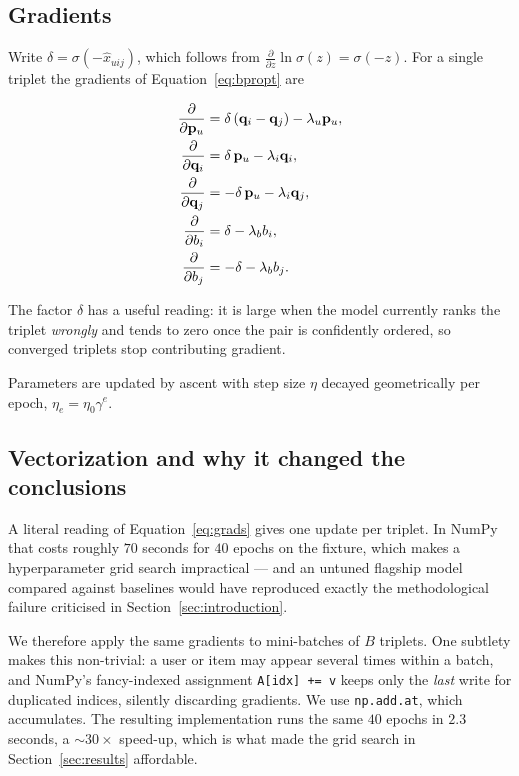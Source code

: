 \subsection{Gradients}

Write $\delta = \sigma(-\hat{x}_{uij})$, which follows from
$\frac{\partial}{\partial z}\ln\sigma(z) = \sigma(-z)$. For a single triplet
the gradients of Equation~\ref{eq:bpropt} are

\begin{align}
  \frac{\partial}{\partial \mathbf{p}_u} &= \delta\,(\mathbf{q}_i - \mathbf{q}_j) - \lambda_u \mathbf{p}_u ,\\
  \frac{\partial}{\partial \mathbf{q}_i} &= \delta\,\mathbf{p}_u - \lambda_i \mathbf{q}_i ,\\
  \frac{\partial}{\partial \mathbf{q}_j} &= -\delta\,\mathbf{p}_u - \lambda_i \mathbf{q}_j ,\\
  \frac{\partial}{\partial b_i}     &= \delta - \lambda_b b_i ,\\
  \frac{\partial}{\partial b_j}     &= -\delta - \lambda_b b_j .
  \label{eq:grads}
\end{align}

The factor $\delta$ has a useful reading: it is large when the model
currently ranks the triplet \emph{wrongly} and tends to zero once the pair is
confidently ordered, so converged triplets stop contributing gradient.

Parameters are updated by ascent with step size $\eta$ decayed
geometrically per epoch, $\eta_{e} = \eta_0 \gamma^{e}$.

\subsection{Vectorization and why it changed the conclusions}

A literal reading of Equation~\ref{eq:grads} gives one update per triplet.
In NumPy that costs roughly $70$ seconds for $40$ epochs on the fixture,
which makes a hyperparameter grid search impractical --- and an untuned
flagship model compared against baselines would have reproduced exactly the
methodological failure criticised in Section~\ref{sec:introduction}.

We therefore apply the same gradients to mini-batches of $B$ triplets. One
subtlety makes this non-trivial: a user or item may appear several times
within a batch, and NumPy's fancy-indexed assignment
\texttt{A[idx] += v} keeps only the \emph{last} write for duplicated indices,
silently discarding gradients. We use \texttt{np.add.at}, which accumulates.
The resulting implementation runs the same $40$ epochs in $2.3$ seconds, a
$\sim 30\times$ speed-up, which is what made the grid search in
Section~\ref{sec:results} affordable.

